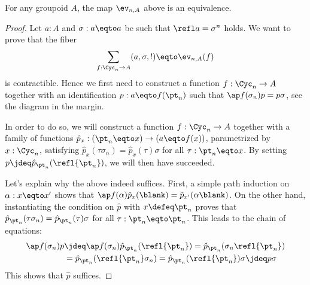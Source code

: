 \begin{theorem}
  For any groupoid $A$, the map $\ev_{n,A}$ above is an equivalence.
  \label{prop:ump-cycn-into-groupoids}
\end{theorem}
\begin{proof}
  Let $a:A$ and $\sigma:a\eqto a$ be such that $\refl a = \sigma^n$ holds.
  We want to prove that the fiber
  \begin{displaymath}
    \sum_{f:\Cyc_n \to A} (a,\sigma, !) \eqto \ev_{n,A}(f)
  \end{displaymath}
  is contractible. Hence we first need to construct a function $f:\Cyc_n \to A$
  together with an identification $p:a\eqto f(\pt_n)$ such that
   $\ap f (\sigma_n) p = p \sigma$, see the diagram in the margin.
  \begin{marginfigure}
\end{marginfigure}

  In order to do so, we will construct a function $f:\Cyc_n \to A$ together with
  a family of functions $\hat p_x: (\pt_n \eqto x) \to (a \eqto f(x))$,
  parametrized by $x:\Cyc_n$,
  satisfying $\hat p_x(\tau\sigma_n) = \hat p_x(\tau) \sigma$ for all
  $\tau: \pt_n \eqto x$.
  By setting $p \jdeq \hat p_{\pt_n}(\refl {\pt_n})$, we will then have succeeded.

  Let's explain why the above indeed suffices.
  First, a simple path induction on $\alpha: x \eqto x'$ shows that
  $\ap f (\alpha) \hat p_x(\blank) = \hat p_{x'}(\alpha \blank)$.
  On the other hand,
  instantiating the condition on $\hat p$ with $x\defeq \pt_n$ proves that
  $\hat p_{\pt_n}(\tau \sigma_n) = \hat p_{\pt_n} (\tau) \sigma$ for all
  $\tau: \pt_n \eqto \pt_n$.
  This leads to the chain of equations:
  \begin{align*}
    \ap f (\sigma_n) p &\jdeq  \ap f (\sigma_n) \hat p_{\pt_n}(\refl {\pt_n})
             = \hat p_{\pt_n}(\sigma_n\refl {\pt_n}) \\
             &= \hat p_{\pt_n}(\refl {\pt_n}\sigma_n)
              = \hat p_{\pt_n}(\refl {\pt_n}) \sigma \jdeq p \sigma
  \end{align*}
  This shows that $\hat p$ suffices.


\end{proof}
